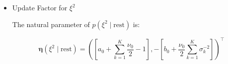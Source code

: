 \begin{appendix}
\begin{itemize}
note that $(\bm{y}_{k} - \bm{X}_{k} \bm{\beta}_k)^\top(\bm{y}_{k} - \bm{X}_{k} \bm{\beta}_k)=\sum_{j=1}^{m}[\gamma_j=k](\bm{y}_{j} - \bm{X}_{j} \bm{\beta}_k)^\top(\bm{y}_{j} - \bm{X}_{j} \bm{\beta}_k)$ and\\ $\sum_{\left\lbrace j : \gamma_j = k\right\rbrace}n_j=\sum_{j=1}^{m}[\gamma_j=k]n_j$ then, the natural parameter of factor is:

\begin{equation}
\begin{split}
\mathsf{E}_{-\sigma_k^2}\left[\bm{\eta}(\sigma_k^2 \mid \text{rest})\right]=&\Bigg(-\left[\frac{\sum_{j=1}^{m}\mathsf{E}_{\gamma_j}\left[[\gamma_j=k]\right]n_j + \nu_0}{2}+1\right],\\
&\quad-\left[ \frac{ \nu_0 \mathsf{E}_{\xi^2}\left[\xi^2\right] +  \sum_{j=1}^{m}\mathsf{E}_{\gamma_j}\left[[\gamma_j=k]\right]\mathsf{E}_{\bm{\beta}_k}\left[\left(\bm{y}_{j} - \bm{X}_{j} \bm{\beta}_k)^\top(\bm{y}_{j} - \bm{X}_{j} \bm{\beta}_k\right)\right]}{2}\right]\Bigg)^\top
\end{split}
\end{equation}

therefore using the inverse mapping from natural to canonical parameters, we have $q(\bm{\beta})=\mathsf{IG}(a_{\sigma_k^2},b_{\sigma_k^2})$, where:

\begin{equation}
a_{\sigma_k^2}= \frac{\nu_0 + \sum_{j=1}^{m}\mathsf{E}_{\gamma_j}\left[[\gamma_j=k]\right]n_j}{2}
\end{equation}

and

\begin{equation}
b_{\sigma_k^2}= \frac{ \nu_0 \mathsf{E}_{\xi^2}\left[\xi^2\right] +  \sum_{j=1}^{m}\mathsf{E}_{\gamma_j}\left[[\gamma_j=k]\right]\mathsf{E}_{\bm{\beta}_k}\left[\left(\bm{y}_{j} - \bm{X}_{j} \bm{\beta}_k)^\top(\bm{y}_{j} - \bm{X}_{j} \bm{\beta}_k\right)\right]}{2}
\end{equation}

\item Update Factor for $\xi^2$

The natural parameter of $p(\xi^2\mid \text{rest}) $ is:

\begin{equation}
\bm{\eta}(\xi^2\mid \text{rest})=\left(\left[ a_0 +\sum_{k=1}^{K}\frac{\nu_0}{2} -1\right],-\left[ b_0 + \frac{\nu_0}{2} \sum_{k=1}^{K}\sigma_k^{-2}\right]\right)^\top
\end{equation}


\end{itemize}
\end{appendix}
